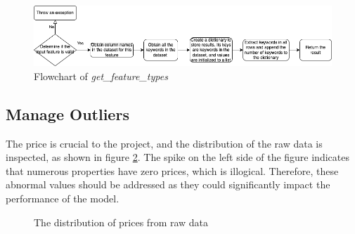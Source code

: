\documentclass[12pt,twoside]{report}
\begin{document}
\begin{figure}[!htbp]
	\centering
	\includegraphics[width=1\linewidth]{generalize_dataset_get_feature_types}
	\caption{Flowchart of \textit{get\_feature\_types}}
	\label{generalize_dataset_get_feature_types}
\end{figure}

\subsection{Manage Outliers}
The price is crucial to the project, and the distribution of the raw data is inspected, as shown in figure \ref{price_raw}. The spike on the left side of the figure indicates that numerous properties have zero prices, which is illogical. Therefore, these abnormal values should be addressed as they could significantly impact the performance of the model.

\begin{figure}[!htbp]
	\centering
	\hfill
	\hfill
	\caption{The distribution of prices from raw data}
	\label{price_raw}
\end{figure}
\end{document}

